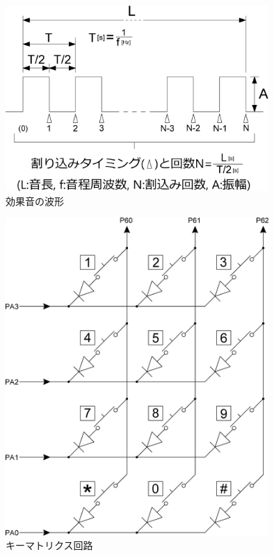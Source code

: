 ﻿\documentclass{jarticle}
\begin{document}
\begin{figure}[!h]
	\begin{center}
		\includegraphics[width=10cm]{./figure4.eps}
	\end{center}
	\caption{効果音の波形}
\end{figure}

\newpage







\newpage

\begin{figure}[h]
	\begin{center}
		\includegraphics[width=10cm]{./figure5.eps}
	\end{center}
	\caption{キーマトリクス回路}
\end{figure}
\end{document}

